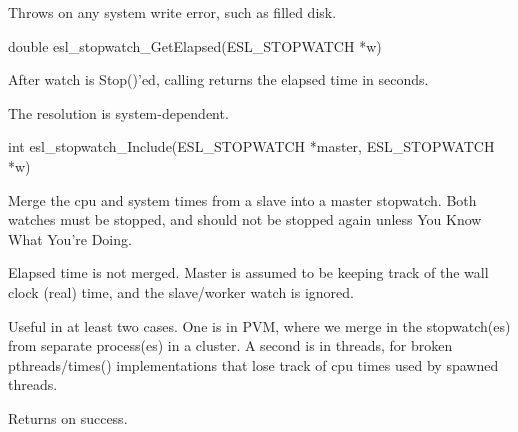 \begin{sreapi}
Throws  on any system write error, such as filled disk.


\hypertarget{func:esl_stopwatch_GetElapsed()}
{\item[double esl\_stopwatch\_GetElapsed(ESL\_STOPWATCH *w)]}

After watch  is Stop()'ed, calling
 returns the elapsed time
in seconds.

The resolution is system-dependent. 


\hypertarget{func:esl_stopwatch_Include()}
{\item[int esl\_stopwatch\_Include(ESL\_STOPWATCH *master, ESL\_STOPWATCH *w)]}

Merge the cpu and system times from a slave into
a master stopwatch. Both watches must be
stopped, and should not be stopped again unless
You Know What You're Doing.

Elapsed time is not merged. Master is assumed
to be keeping track of the wall clock (real) time,
and the slave/worker watch is ignored.

Useful in at least two cases. One is in 
PVM, where we merge in the stopwatch(es) from separate
process(es) in a cluster. A second is in 
threads, for broken pthreads/times() implementations
that lose track of cpu times used by spawned
threads.

Returns  on success.


\end{sreapi}

